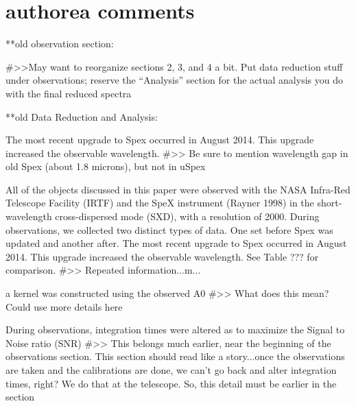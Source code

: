 \section{authorea comments}

**old observation section:

#>>May want to reorganize sections 2, 3, and 4 a bit. Put data reduction stuff under observations; reserve the “Analysis” section for the actual analysis you do with the final reduced spectra







 **old Data Reduction and Analysis:

  The most recent upgrade to Spex occurred in August 2014. This upgrade increased the observable wavelength.
  #>> Be sure to mention wavelength gap in old Spex (about 1.8 microns), but not in uSpex

   All of the objects discussed in this paper were observed with the NASA Infra-Red Telescope Facility (IRTF) and the SpeX instrument (Rayner 1998) in the short-wavelength cross-dispersed mode (SXD), with a resolution of 2000. During observations, we collected two distinct types of data. One set before Spex was updated and another after. The most recent upgrade to Spex occurred in August 2014. This upgrade increased the observable wavelength. See Table ??? for comparison.
   #>> Repeated information...m...

 a kernel was constructed using the observed A0
   #>> What does this mean? Could use more details here

   During observations, integration times were altered as to maximize the Signal to Noise ratio (SNR)
   #>> This belongs much earlier, near the beginning of the observations section. This section should read like a story...once the observations are taken and the calibrations are done, we can't go back and alter integration times, right? We do that at the telescope. So, this detail must be earlier in the section